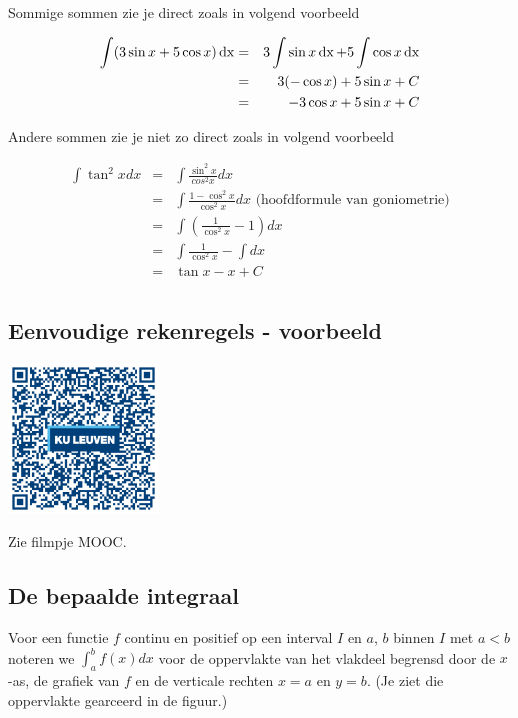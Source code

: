 Sommige sommen zie je direct zoals in volgend voorbeeld

\begin{voorbeeld} 
	\begin{eqnarray*}
	\int (3 \sin x + 5 \cos x) \operatorname{dx} &=& 3 \int \sin x \operatorname{dx} + 5 \int \cos x \operatorname{dx} \\
	&=& 3 (-\cos x ) + 5 \sin x +C \\
	&=& -3 \cos x + 5 \sin x + C
	\end{eqnarray*}
\end{voorbeeld}

Andere sommen zie je niet zo direct zoals in volgend voorbeeld

\begin{voorbeeld}
	\begin{eqnarray*}
	\int \tan ^2 x dx
	&=&\int \frac{\sin^2 x}{cos ^2 x}dx\\
	&=& \int \frac{1-\cos^2 x}{\cos ^2 x} dx \text { (hoofdformule van goniometrie)}\\
	&=& \int \left( \frac{1}{\cos^2 x} -1 \right)dx\\
	&=& \int \frac{1}{\cos ^2 x} - \int dx\\
	&=& \tan x -x +C\\
	\end{eqnarray*}
\end{voorbeeld}

\subsection{Eenvoudige rekenregels - voorbeeld}
\begin{minipage}{.25\linewidth}
	\raggedright
	\includegraphics[width=4cm]{6_afgeleiden_integralen/inputs/QR_Code_EENVRRVB_module6_2new}
\end{minipage}
\begin{minipage}{.7\linewidth}
	Zie filmpje MOOC.
\end{minipage}

\subsection{De bepaalde integraal}
Voor een functie $f$ continu en positief op een interval $I$ en $a$, $b$ binnen $I$ met $a<b$ noteren we $\int^b_a f(x)dx$ voor de oppervlakte van het vlakdeel begrensd door de $x$-as, de grafiek van $f$ en de verticale rechten $x=a$ en $y=b$.
(Je ziet die oppervlakte gearceerd in de figuur.)

